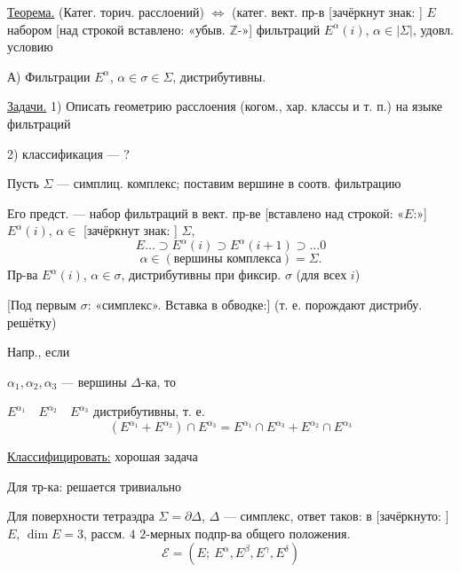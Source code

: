 \underline{Теорема.}
(Катег. торич. расслоений) $\Longleftrightarrow$
(катег. вект. пр-в
[зачёркнут знак:
]
$E$ набором [над строкой вставлено: «убыв. $\mathbb Z$-»]
фильтраций $E^\alpha(i)$, $\alpha\in|\Sigma|$, удовл. условию

А) Фильтрации $E^\alpha$, $\alpha\in\sigma\in\Sigma$,
дистрибутивны.

\underline{Задачи.}
1) Описать геометрию расслоения (когом., хар. классы
и т. п.) на языке фильтраций

2) классификация — ?

Пусть $\Sigma$ — симплиц. комплекс; поставим вершине в соотв.
фильтрацию

Его предст. — набор фильтраций в вект. пр-ве
[вставлено над строкой: «$E$:»] $E^\alpha(i)$,
$\alpha\in$ [зачёркнут знак:
]
$\Sigma$,
\begin{equation*}
E\ldots\supset E^\alpha(i)\supset E^\alpha(i+1)\supset\ldots 0
\end{equation*}
\begin{equation*}
\alpha\in(\text{вершины комплекса})=\Sigma.
\end{equation*}
Пр-ва $E^\alpha(i)$, $\alpha\in\sigma$, дистрибутивны при фиксир. $\sigma$
(для всех $i$)

[Под первым $\sigma$: «симплекс». Вставка в обводке:]
(т. е. порождают дистрибу. решётку)

Напр., если

$\alpha_1,\alpha_2,\alpha_3$ — вершины $\Delta$-ка, то

$E^{\alpha_1}\quad E^{\alpha_2}\quad E^{\alpha_3}$ дистрибутивны, т. е.
\begin{equation*}
(E^{\alpha_1}+E^{\alpha_2})\cap E^{\alpha_3}
=E^{\alpha_1}\cap E^{\alpha_3}+E^{\alpha_2}\cap E^{\alpha_3}
\end{equation*}

\underline{Классифицировать:} хорошая задача

Для тр-ка: решается тривиально

Для поверхности тетраэдра $\Sigma=\partial\Delta$, $\Delta$ — симплекс, ответ
таков: в [зачёркнуто:
]
$E$, $\dim E=3$, рассм. $4$ $2$-мерных подпр-ва общего положения.
\begin{equation*}
\mathcal E=(E;\ E^\alpha,E^\beta,E^\gamma,E^\delta)
\end{equation*}


